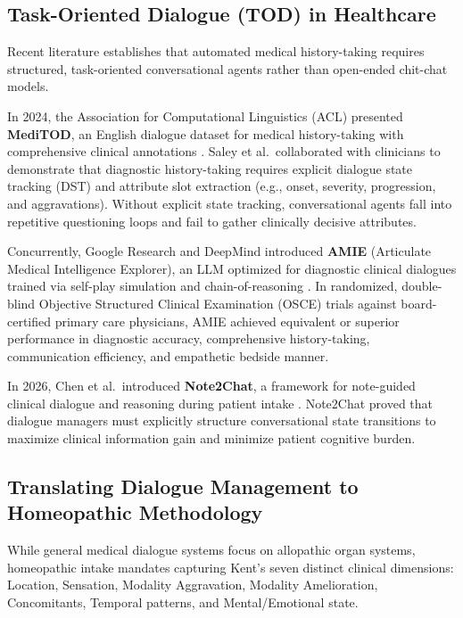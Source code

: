 \begin{sloppypar}
\subsection{Task-Oriented Dialogue (TOD) in Healthcare}
Recent literature establishes that automated medical history-taking requires structured, task-oriented conversational agents rather than open-ended chit-chat models.

In 2024, the Association for Computational Linguistics (ACL) presented \textbf{MediTOD}, an English dialogue dataset for medical history-taking with comprehensive clinical annotations \cite{Saley2024_MediTOD}. Saley et al.~collaborated with clinicians to demonstrate that diagnostic history-taking requires explicit dialogue state tracking (DST) and attribute slot extraction (e.g., onset, severity, progression, and aggravations). Without explicit state tracking, conversational agents fall into repetitive questioning loops and fail to gather clinically decisive attributes.

Concurrently, Google Research and DeepMind introduced \textbf{AMIE} (Articulate Medical Intelligence Explorer), an LLM optimized for diagnostic clinical dialogues trained via self-play simulation and chain-of-reasoning \cite{Tu2024_AMIE}. In randomized, double-blind Objective Structured Clinical Examination (OSCE) trials against board-certified primary care physicians, AMIE achieved equivalent or superior performance in diagnostic accuracy, comprehensive history-taking, communication efficiency, and empathetic bedside manner.

In 2026, Chen et al.~introduced \textbf{Note2Chat}, a framework for note-guided clinical dialogue and reasoning during patient intake \cite{Note2Chat2026}. Note2Chat proved that dialogue managers must explicitly structure conversational state transitions to maximize clinical information gain and minimize patient cognitive burden.

\subsection{Translating Dialogue Management to Homeopathic Methodology}
While general medical dialogue systems focus on allopathic organ systems, homeopathic intake mandates capturing Kent's seven distinct clinical dimensions: Location, Sensation, Modality Aggravation, Modality Amelioration, Concomitants, Temporal patterns, and Mental/Emotional state. 


\end{sloppypar}
